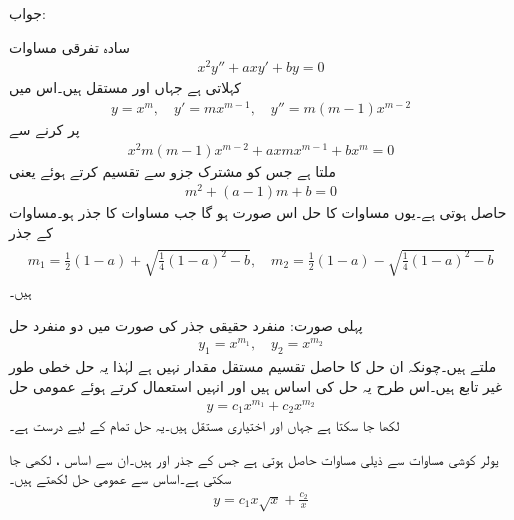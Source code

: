 جواب:

سادہ تفرقی مساوات 
\begin{align}\label{مساوات_سادہ_دو_درجی_یولر_کوشی_الف}
x^2y''+axy'+by=0
\end{align}
 کہلاتی ہے جہاں  اور  مستقل ہیں۔اس میں
\begin{align*}
y=x^m, \quad y'=mx^{m-1}, \quad y''=m(m-1)x^{m-2}
\end{align*}
پر کرنے سے
\begin{align*}
x^2m(m-1)x^{m-2}+axmx^{m-1}+bx^m=0
\end{align*}
ملتا ہے جس کو مشترک جزو  سے تقسیم کرتے ہوئے   یعنی
\begin{align}\label{مساوات_سادہ_دو_درجی_یولر_کوشی_ب}
m^2+(a-1)m+b=0
\end{align}
حاصل ہوتی ہے۔یوں  مساوات  کا حل اس صورت ہو گا جب  مساوات  کا جذر ہو۔مساوات  کے جذر
\begin{gather}
\begin{aligned}\label{مساوات_سادہ_دو_درجی_یولر_کوشی_پ}
m_1=\frac{1}{2}(1-a)+\sqrt{\frac{1}{4}(1-a)^2-b}, \quad m_2=\frac{1}{2}(1-a)-\sqrt{\frac{1}{4}(1-a)^2-b}
\end{aligned}
\end{gather}
ہیں۔

پہلی صورت: منفرد حقیقی جذر کی صورت میں دو منفرد حل 
\begin{align*}
y_1=x^{m_1},\quad y_2=x^{m_2}
\end{align*}
ملتے ہیں۔چونکہ ان حل کا حاصل تقسیم مستقل مقدار نہیں ہے لہٰذا یہ حل خطی طور غیر تابع ہیں۔اس طرح یہ حل کی اساس ہیں اور انہیں استعمال کرتے ہوئے عمومی حل
\begin{align}
y=c_1x^{m_1}+c_2x^{m_2}
\end{align}
لکھا جا سکتا ہے جہاں  اور  اختیاری مستقل ہیں۔یہ حل تمام  کے لیے درست ہے۔

یولر کوشی مساوات  سے  ذیلی مساوات حاصل ہوتی ہے جس کے جذر  اور  ہیں۔ان سے اساس ،  لکھی جا سکتی ہے۔اساس سے عمومی حل لکھتے ہیں۔
\begin{align*}
y=c_1x\sqrt{x}+\frac{c_2}{x}
\end{align*}

